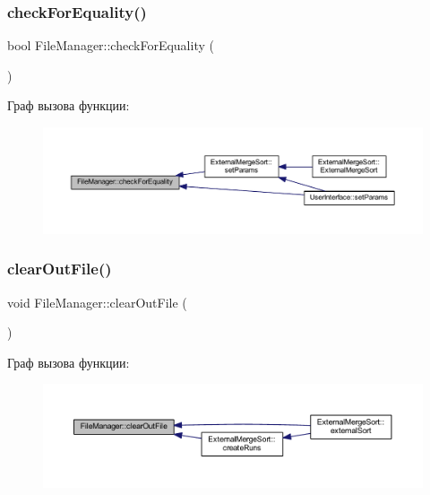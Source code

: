 \subsubsection{\texorpdfstring{check\+For\+Equality()}{checkForEquality()}}
{\footnotesize\ttfamily bool File\+Manager\+::check\+For\+Equality (\begin{DoxyParamCaption}{ }\end{DoxyParamCaption})}

Граф вызова функции\+:\nopagebreak
\begin{figure}[H]
\begin{center}
\leavevmode
\includegraphics[width=350pt]{class_file_manager_ab490a5a5882d33781dcb6d1d42945d97_icgraph}
\end{center}
\end{figure}
\hypertarget{class_file_manager_a2f1102abfd0a5a9d7e178968a3fdc56c}{}\label{class_file_manager_a2f1102abfd0a5a9d7e178968a3fdc56c} 
\subsubsection{\texorpdfstring{clear\+Out\+File()}{clearOutFile()}}
{\footnotesize\ttfamily void File\+Manager\+::clear\+Out\+File (\begin{DoxyParamCaption}{ }\end{DoxyParamCaption})}

Граф вызова функции\+:\nopagebreak
\begin{figure}[H]
\begin{center}
\leavevmode
\includegraphics[width=350pt]{class_file_manager_a2f1102abfd0a5a9d7e178968a3fdc56c_icgraph}
\end{center}
\end{figure}
\hypertarget{class_file_manager_a4a4719a410ca31985e8b75ad75485ce6}{}\label{class_file_manager_a4a4719a410ca31985e8b75ad75485ce6} 
